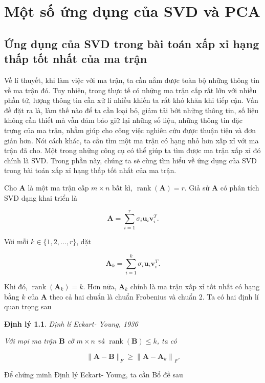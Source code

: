 \documentclass[12pt,a4paper,oneside]{report}
\newtheorem{dl}{Định lý}[section]
\numberwithin{equation}{section}
\begin{document}
\chapter{ Một số ứng dụng của SVD và PCA }
\section{Ứng dụng của SVD trong bài toán xấp xỉ hạng thấp tốt nhất của ma trận}
Về lí thuyết, khi làm việc với ma trận, ta cần nắm được toàn bộ những thông tin về ma trận đó. Tuy nhiên, trong thực tế có những ma trận cấp rất lớn với nhiều phần tử, lượng thông tin cần xử lí nhiều khiến ta rất khó khăn khi tiếp cận. Vấn đề đặt ra là, làm thế nào để ta cần loại bỏ, giảm tải bớt những thông tin, số liệu không cần thiết mà vẫn đảm bảo giữ lại những số liệu, những thông tin đặc trưng của ma trận, nhằm giúp cho công việc nghiên cứu được thuận tiện và đơn giản hơn. Nói cách khác, ta cần tìm một ma trận có hạng nhỏ hơn xấp xỉ với ma trận đã cho. Một trong những công cụ có thể giúp ta tìm được ma trận xấp xỉ đó chính là SVD. Trong phần này, chúng ta sẽ cùng tìm hiểu về ứng dụng của SVD trong bài toán xấp xỉ hạng thấp tốt nhất của ma trận. 

Cho $\mathbf{A}$ là một ma trận cấp $m \times n$ bất kì, $\operatorname{rank}(\mathbf{A})=r$. Giả sử $\mathbf{A}$ có phân tích SVD dạng khai triển là

$$
\mathbf{A}=\sum_{i=1}^{r} \sigma_{i} \mathbf{u}_{i} \mathbf{v}_{i}^{T} .
$$

Với mỗi $k \in\{1,2, \ldots, r\}$, dặt

$$
\mathbf{A}_{k}=\sum_{i=1}^{k} \sigma_{i} \mathbf{u}_{i} \mathbf{v}_{i}^{T}.
$$

Khi đó, $\operatorname{rank}\left(\mathbf{A}_{k}\right)=k$. Hơn nữa, $\mathbf{A}_{k}$ chính là ma trận xấp xỉ tốt nhất có hạng bằng $k$ của $\mathbf{A}$ theo cả hai chuẩn là chuẩn Frobenius và chuẩn 2. Ta có hai định lí quan trọng sau

\begin{dl} \cite{eckart1936} {Định lí Eckart- Young, 1936}  \label{eckart}

Với mọi ma trận $\mathbf{B}$ cỡ $m \times n$ và $\operatorname{rank}(\mathbf{B}) \leqslant k$, ta có

$$
\|\mathbf{A}-\mathbf{B}\|_{F} \geqslant\left\|\mathbf{A}-\mathbf{A}_{k}\right\|_{F} .
$$
\end{dl}
Để chứng minh Định lý Eckart- Young, ta cần Bổ đề sau
\end{document}
